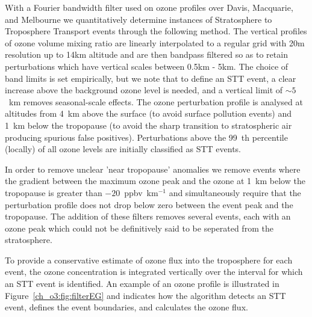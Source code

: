     With a Fourier bandwidth filter used on ozone profiles over Davis, Macquarie, and Melbourne we quantitatively determine instances of Stratosphere to Troposphere Transport events through the following method.
    The vertical profiles of ozone volume mixing ratio are linearly interpolated to a regular grid with 20m resolution up to 14km altitude and are then bandpass filtered so as to retain perturbations which have vertical scales between 0.5km - 5km. 
    The choice of band limits is set empirically, but we note that to define an STT event, a clear increase above the background ozone level is needed, and a vertical limit of $\sim 5$~km removes seasonal-scale effects. 
    The ozone perturbation profile is analysed at altitudes from 4~km above the surface (to avoid surface pollution events) and 1~km below the tropopause (to avoid the sharp transition to stratospheric air producing spurious false positives). 
    Perturbations above the 99~th percentile (locally) of all ozone levels are initially classified as STT events.
    
    In order to remove unclear 'near tropopause' anomalies we remove events where the gradient between the maximum ozone peak and the ozone at 1~km below the tropopause is greater than $-20$~ppbv~km$^{-1}$ and simultaneously require that the perturbation profile does not drop below zero between the event peak and the tropopause.
    The addition of these filters removes several events, each with an ozone peak which could not be definitively said to be seperated from the stratosphere.
    
    To provide a conservative estimate of ozone flux into the troposphere for each event, the ozone concentration is integrated vertically over the interval for which an STT event is identified.
    An example of an ozone profile is illustrated in Figure~\ref{ch_o3:fig:filterEG} and indicates how the algorithm detects an STT event, defines the event boundaries, and calculates the ozone flux.
    
